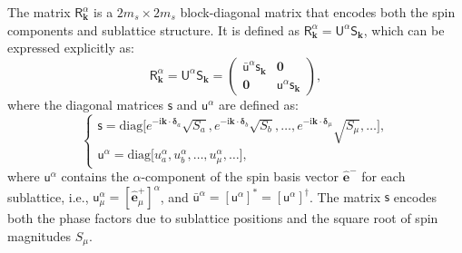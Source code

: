\documentclass[aps, prx, nofootinbib, superscriptaddress]{revtex4-2}
\newcommand{\kvec}{\mathbf{k}}
\newcommand{\ri}{\mathrm{i}}
\begin{document}
The matrix $\mathsf{R}^{\alpha}_{\kvec}$ is a $2m_s \times 2m_s$ block-diagonal matrix that encodes both the spin components and sublattice structure. It is defined as $\mathsf{R}^{\alpha}_{\kvec} = \mathsf{U}^{\alpha} \mathsf{S}_{\kvec}$, which can be expressed explicitly as:
\begin{equation}
    \mathsf{R}^{\alpha}_{\kvec} 
    = \mathsf{U}^{\alpha} \mathsf{S}_{\kvec}
    =
    \begin{pmatrix}
        \bar{\mathsf{u}}^{\alpha} \mathsf{s}_{\kvec} & \mathbf{0} \\
        \mathbf{0} & \mathsf{u}^{\alpha} \mathsf{s}_{\kvec} 
    \end{pmatrix},
\end{equation}
where the diagonal matrices $\mathsf{s}$ and $\mathsf{u}^{\alpha}$ are defined as:
\begin{equation}
    \begin{cases}
        \mathsf{s} = \text{diag} \big[ e^{-\ri \kvec \cdot \boldsymbol{\delta}_a} \sqrt{S_a}, e^{-\ri \kvec \cdot \boldsymbol{\delta}_b} \sqrt{S_b}, \dots, e^{-\ri \kvec \cdot \boldsymbol{\delta}_\mu} \sqrt{S_\mu}, \dots \big], \\
        \mathsf{u}^{\alpha} = \text{diag} \big[ u_a^{\alpha}, u_b^{\alpha}, \dots, u_\mu^{\alpha}, \dots \big],
    \end{cases}
\end{equation}
where $\mathsf{u}^{\alpha}$ contains the $\alpha$-component of the spin basis vector $\hat{\mathbf{e}}^-$ for each sublattice, i.e., $\mathsf{u}^{\alpha}_\mu = [\hat{\mathbf{e}}^+_\mu]^{\alpha}$, and $\bar{\mathsf{u}}^{\alpha} = [\mathsf{u}^{\alpha}]^* = [\mathsf{u}^{\alpha}]^{\dagger}$. The matrix $\mathsf{s}$ encodes both the phase factors due to sublattice positions and the square root of spin magnitudes $S_\mu$.
\end{document}
